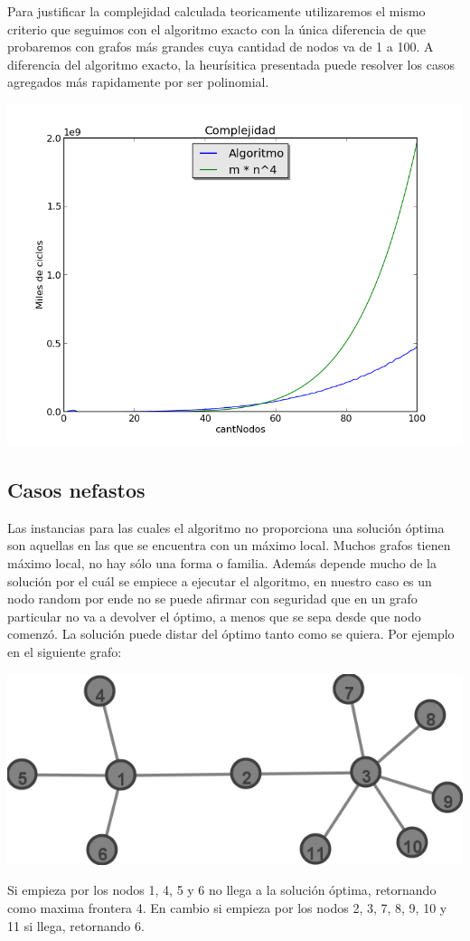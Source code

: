 Para justificar la complejidad calculada teoricamente utilizaremos el mismo criterio que seguimos con el algoritmo exacto con la única diferencia de que probaremos con grafos más grandes cuya cantidad de nodos va de 1 a 100. A diferencia del algoritmo exacto, la heurísitica presentada puede resolver los casos agregados más rapidamente por ser polinomial.

\begin{center}
\includegraphics[scale=0.6]{Images/complejidad.png} 
\end{center}

\subsection{Casos nefastos}
Las instancias para las cuales el algoritmo no proporciona una solución óptima son aquellas en las que se encuentra con un máximo local. Muchos grafos tienen máximo local, no hay sólo una forma o familia. Además depende mucho de la solución por el cuál se empiece a ejecutar el algoritmo, en nuestro caso es un nodo random por ende no se puede afirmar con seguridad que en un grafo particular no va a devolver el óptimo, a menos que se sepa desde que nodo comenzó.
La solución puede distar del óptimo tanto como se quiera.
Por ejemplo en el siguiente grafo:

\begin{center}
\includegraphics[scale=0.5]{Images/ejemploCasoMaloLocal.png} 
\end{center}

Si empieza por los nodos 1, 4, 5 y 6 no llega a la solución óptima, retornando como maxima frontera 4.
En cambio si empieza por los nodos 2, 3, 7, 8, 9, 10 y 11 si llega, retornando 6.






